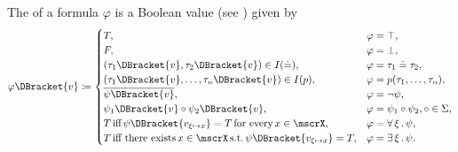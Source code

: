 \begin{definition}
\begin{DefEnum}
     The  of a formula \( \varphi \) is a Boolean value (see ) given by
    \begin{equation}\label{eq:def:first_order_valuation/formula_valuation}
      \varphi\DBracket{v} \coloneqq \begin{cases}
        T,                                                                              &\varphi = \top, \\
        F,                                                                              &\varphi = \bot, \\
        (\tau_1\DBracket{v}, \tau_2\DBracket{v}) \in I(\doteq),                         &\varphi = \tau_1 \doteq \tau_2, \\
        (\tau_1\DBracket{v}, \ldots, \tau_n\DBracket{v}) \in I(p),                      &\varphi = p(\tau_1, \ldots, \tau_n), \\
        \overline{\psi\DBracket{v}},                                                          &\varphi = \neg \psi, \\
        \psi_1\DBracket{v} \circ \psi_2\DBracket{v},                                    &\varphi = \psi_1 \circ \psi_2, \circ \in \Sigma, \\
        T \T{iff} \psi\DBracket{v_{\xi \mapsto x}} = T \T{for every} x \in \mscrX,         &\varphi = \Qnt{\forall}{\xi} \psi, \\
        T \T{iff there exists} x \in \mscrX \T{s.t.} \psi\DBracket{v_{\xi \mapsto x}} = T, &\varphi = \Qnt{\exists}{\xi} \psi.
      \end{cases}
    \end{equation}
  \end{DefEnum}
\end{definition}

